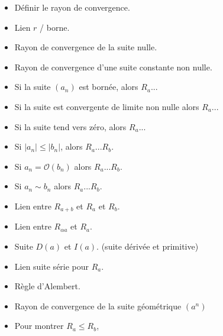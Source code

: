 \documentclass[a4paper, 11pt, hidelinks]{article}
\begin{document}
\begin{itemize}
    \item Définir le rayon de convergence.
    \item Lien $r$ / borne.
    \item Rayon de convergence de la suite nulle.
    \item Rayon de convergence d'une suite constante non nulle.
    \item Si la suite $(a_n)$ est bornée, alors $R_a$...
    \item Si la suite est convergente de limite non nulle alors $R_a$...
    \item Si la suite tend vers zéro, alors $R_a$...
    \item Si $|a_n| \leq |b_n|$, alors $R_a$...$R_b$.
    \item Si $a_n= \mathcal{O}(b_n)$ alors $R_a$...$R_b$.
    \item Si $a_n \sim b_n$ alors $R_a$...$R_b$.
    \item Lien entre $R_{a+b}$ et $R_a$ et $R_b$.
    \item Lien entre $R_{\alpha a}$ et $R_a$.
    \item Suite $D(a)$ et $I(a)$. (suite dérivée et primitive)
    \item Lien suite série pour $R_a$.
    \item Règle d'Alembert.
    \item Rayon de convergence de la suite géométrique $(a^n)$
    \item Pour montrer $R_a \leq R_b$,
    

\end{itemize}
\end{document}
